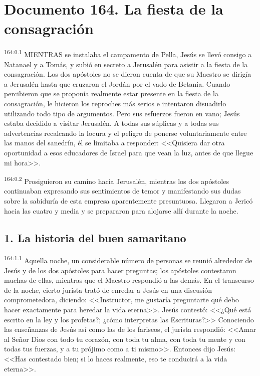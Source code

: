 \chapter{Documento 164. La fiesta de la consagración}
\par 
\textsuperscript{164:0.1} MIENTRAS se instalaba el campamento de Pella, Jesús se llevó consigo a Natanael y a Tomás, y subió en secreto a Jerusalén para asistir a la fiesta de la consagración. Los dos apóstoles no se dieron cuenta de que su Maestro se dirigía a Jerusalén hasta que cruzaron el Jordán por el vado de Betania. Cuando percibieron que se proponía realmente estar presente en la fiesta de la consagración, le hicieron los reproches más serios e intentaron disuadirlo utilizando todo tipo de argumentos. Pero sus esfuerzos fueron en vano; Jesús estaba decidido a visitar Jerusalén. A todas sus súplicas y a todas sus advertencias recalcando la locura y el peligro de ponerse voluntariamente entre las manos del sanedrín, él se limitaba a responder: <<Quisiera dar otra oportunidad a esos educadores de Israel para que vean la luz, antes de que llegue mi hora>>.

\par 
\textsuperscript{164:0.2} Prosiguieron su camino hacia Jerusalén, mientras los dos apóstoles continuaban expresando sus sentimientos de temor y manifestando sus dudas sobre la sabiduría de esta empresa aparentemente presuntuosa. Llegaron a Jericó hacia las cuatro y media y se prepararon para alojarse allí durante la noche.

\section*{1. La historia del buen samaritano}
\par 
\textsuperscript{164:1.1} Aquella noche, un considerable número de personas se reunió alrededor de Jesús y de los dos apóstoles para hacer preguntas; los apóstoles contestaron muchas de ellas, mientras que el Maestro respondió a las demás. En el transcurso de la noche, cierto jurista trató de enredar a Jesús en una discusión comprometedora, diciendo: <<Instructor, me gustaría preguntarte qué debo hacer exactamente para heredar la vida eterna>>. Jesús contestó: <<¿Qué está escrito en la ley y los profetas?; ¿cómo interpretas las Escrituras?>> Conociendo las enseñanzas de Jesús así como las de los fariseos, el jurista respondió: <<Amar al Señor Dios con todo tu corazón, con toda tu alma, con toda tu mente y con todas tus fuerzas, y a tu prójimo como a ti mismo>>. Entonces dijo Jesús: <<Has contestado bien; si lo haces realmente, eso te conducirá a la vida eterna>>.

